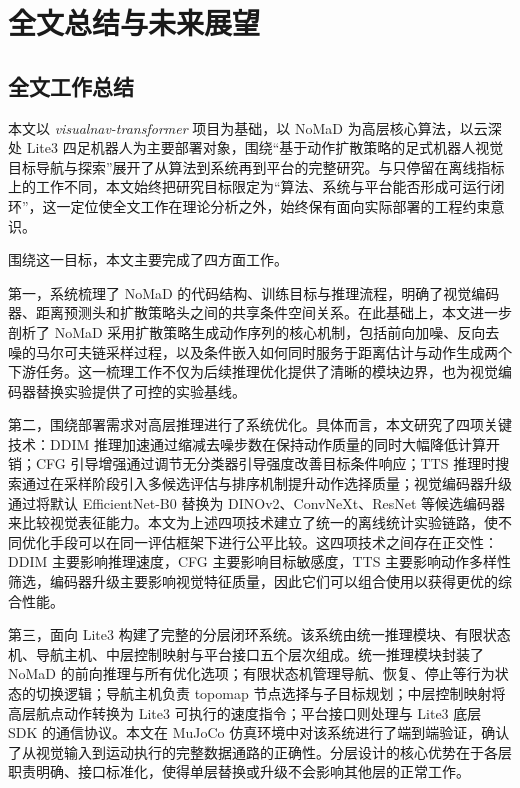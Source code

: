 
\chapter{全文总结与未来展望}

\section{全文工作总结}

本文以 \textit{visualnav-transformer} 项目为基础，以 NoMaD 为高层核心算法，以云深处 Lite3 四足机器人为主要部署对象，围绕``基于动作扩散策略的足式机器人视觉目标导航与探索''展开了从算法到系统再到平台的完整研究。与只停留在离线指标上的工作不同，本文始终把研究目标限定为``算法、系统与平台能否形成可运行闭环''，这一定位使全文工作在理论分析之外，始终保有面向实际部署的工程约束意识。

围绕这一目标，本文主要完成了四方面工作。

第一，系统梳理了 NoMaD\cite{nomad2023} 的代码结构、训练目标与推理流程，明确了视觉编码器、距离预测头和扩散策略头之间的共享条件空间关系。在此基础上，本文进一步剖析了 NoMaD 采用扩散策略生成动作序列的核心机制，包括前向加噪、反向去噪的马尔可夫链采样过程，以及条件嵌入如何同时服务于距离估计与动作生成两个下游任务。这一梳理工作不仅为后续推理优化提供了清晰的模块边界，也为视觉编码器替换实验提供了可控的实验基线。

第二，围绕部署需求对高层推理进行了系统优化。具体而言，本文研究了四项关键技术：DDIM 推理加速通过缩减去噪步数在保持动作质量的同时大幅降低计算开销；CFG 引导增强通过调节无分类器引导强度改善目标条件响应；TTS 推理时搜索通过在采样阶段引入多候选评估与排序机制提升动作选择质量；视觉编码器升级通过将默认 EfficientNet-B0 替换为 DINOv2、ConvNeXt、ResNet 等候选编码器来比较视觉表征能力。本文为上述四项技术建立了统一的离线统计实验链路，使不同优化手段可以在同一评估框架下进行公平比较。这四项技术之间存在正交性：DDIM 主要影响推理速度，CFG 主要影响目标敏感度，TTS 主要影响动作多样性筛选，编码器升级主要影响视觉特征质量，因此它们可以组合使用以获得更优的综合性能。

第三，面向 Lite3 构建了完整的分层闭环系统。该系统由统一推理模块、有限状态机、导航主机、中层控制映射与平台接口五个层次组成。统一推理模块封装了 NoMaD 的前向推理与所有优化选项；有限状态机管理导航、恢复、停止等行为状态的切换逻辑；导航主机负责 topomap 节点选择与子目标规划；中层控制映射将高层航点动作转换为 Lite3 可执行的速度指令；平台接口则处理与 Lite3 底层 SDK 的通信协议。本文在 MuJoCo 仿真环境中对该系统进行了端到端验证，确认了从视觉输入到运动执行的完整数据通路的正确性。分层设计的核心优势在于各层职责明确、接口标准化，使得单层替换或升级不会影响其他层的正常工作。

